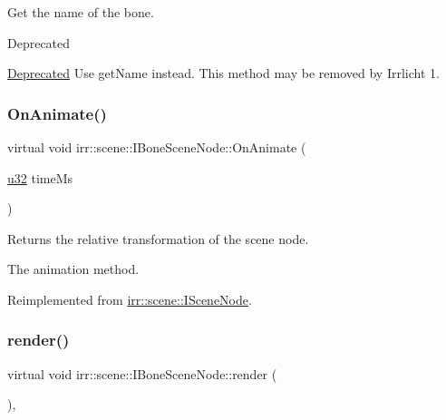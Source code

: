 Get the name of the bone. 

\begin{DoxyRefDesc}{Deprecated}
\item[\hyperlink{deprecated__deprecated000001}{Deprecated}]Use get\+Name instead. This method may be removed by Irrlicht 1. \end{DoxyRefDesc}
\mbox{\label{classirr_1_1scene_1_1IBoneSceneNode_a7e21d0722e5b105e4d2a956bff110a7f}} 
\subsubsection{\texorpdfstring{On\+Animate()}{OnAnimate()}}
{\footnotesize\ttfamily virtual void irr\+::scene\+::\+I\+Bone\+Scene\+Node\+::\+On\+Animate (\begin{DoxyParamCaption}\item[{\hyperlink{namespaceirr_a0416a53257075833e7002efd0a18e804}{u32}}]{time\+Ms }\end{DoxyParamCaption})\hspace{0.3cm}{\ttfamily [pure virtual]}}



Returns the relative transformation of the scene node. 

The animation method. 

Reimplemented from \hyperlink{classirr_1_1scene_1_1ISceneNode_afc1dcb5cb19116d0c7aa3d4ebdf04cc5}{irr\+::scene\+::\+I\+Scene\+Node}.

\mbox{\label{classirr_1_1scene_1_1IBoneSceneNode_ac942248f09d2db69804ea47476e3829e}} 
\subsubsection{\texorpdfstring{render()}{render()}}
{\footnotesize\ttfamily virtual void irr\+::scene\+::\+I\+Bone\+Scene\+Node\+::render (\begin{DoxyParamCaption}{ }\end{DoxyParamCaption})\hspace{0.3cm}{\ttfamily [inline]}, {\ttfamily [virtual]}}



